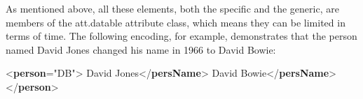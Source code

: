 As mentioned above, all these elements, both the specific and the generic, are members of the \textsf{att.datable} attribute class, which means they can be limited in terms of time. The following encoding, for example, demonstrates that the person named David Jones changed his name in 1966 to David Bowie: \par\bgroup{}\exampleFont \begin{shaded}\noindent\mbox{}{<\textbf{person}\hspace*{1em}{xml:id}="{DB}">}\mbox{}\newline 
{}David Jones{</\textbf{persName}>}\mbox{}\newline 
{}David Bowie{</\textbf{persName}>}\mbox{}\newline 
{</\textbf{person}>}\end{shaded}\egroup\par \par
